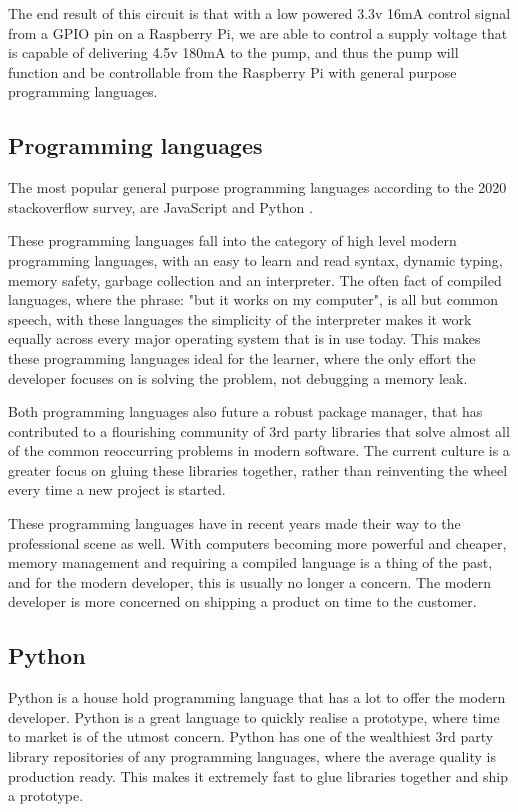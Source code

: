 \documentclass[12pt,a4paper,oneside]{book}
\begin{document}
The end result of this circuit is that with a low powered 3.3v 16mA control signal from a GPIO pin on a Raspberry Pi, we are able to control a supply voltage that is capable of delivering 4.5v 180mA to the pump, and thus the pump will function and be controllable from the Raspberry Pi with general purpose programming languages.

\subsection{Programming languages}
The most popular general purpose programming languages according to the 2020 stackoverflow survey, are JavaScript and Python \cite{stackoverflow_survey}.

These programming languages fall into the category of high level modern programming languages, with an easy to learn and read syntax, dynamic typing, memory safety, garbage collection and an interpreter.
The often fact of compiled languages, where the phrase: "but it works on my computer", is all but common speech, with these languages the simplicity of the interpreter makes it work equally across every major operating system that is in use today.
This makes these programming languages ideal for the learner, where the only effort the developer focuses on is solving the problem, not debugging a memory leak.

Both programming languages also future a robust package manager, that has contributed to a flourishing community of 3rd party libraries that solve almost all of the common reoccurring problems in modern software. The current culture is a greater focus on gluing these libraries together, rather than reinventing the wheel every time a new project is started.

These programming languages have in recent years made their way to the professional scene as well. With computers becoming more powerful and cheaper, memory management and requiring a compiled language is a thing of the past, and for the modern developer, this is usually no longer a concern.
The modern developer is more concerned on shipping a product on time to the customer.

\subsection{Python}
Python is a house hold programming language that has a lot to offer the modern developer. Python is a great language to quickly realise a prototype, where time to market is of the utmost concern.
Python has one of the wealthiest 3rd party library repositories of any programming languages, where the average quality is production ready. This makes it extremely fast to glue libraries together and ship a prototype.
\end{document}
